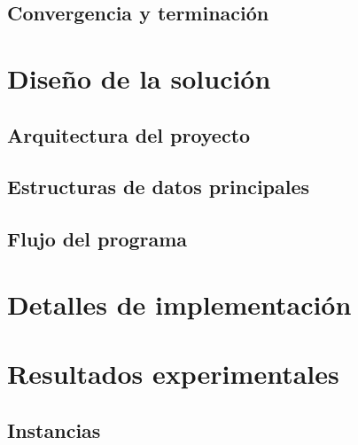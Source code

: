 \documentclass[9pt,a4paper,twocolumn,twoside]{tau-class/tau}
\begin{document}
    \subsection{Convergencia y terminaci\'on}


\section{Dise\~no de la soluci\'on}\label{sec:diseno}

    \subsection{Arquitectura del proyecto}

    \subsection{Estructuras de datos principales}

    \subsection{Flujo del programa}


\section{Detalles de implementaci\'on}


\section{Resultados experimentales}

    \subsection{Instancias}
\end{document}
